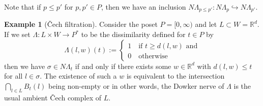 \documentclass[10pt,a4paper]{article}
\theoremstyle{definition}
\newtheorem{ex}{Example}[thm]
\newcommand{\R}{\mathbb{R}}
\begin{document}
Note that if $p\leq p'$ for $p,p'\in P$, then we have an inclusion $N\Lambda_{p\leq p'}\colon N\Lambda_p\hookrightarrow N\Lambda_{p'}$.

\begin{ex}[Čech filtration]
	Consider the poset $P=[0,\infty)$ and let $L\subset W=\R^d$. If we set $\Lambda\colon L\times W\to P^*$ to be the dissimilarity defined for $t\in P$ by 
	$$
	\Lambda(l,w)(t) := \begin{cases}
		1\quad\text{if }t\geq d(l,w) \text{ and}\\
		0\quad\text{otherwise}
	\end{cases}
	$$
	then we have $\sigma\in N\Lambda_t$ if and only if there exists some $w\in\R^d$ with $d(l,w)\leq t$ for all $l\in\sigma$. The existence of such a $w$ is equivalent to the intersection $\bigcap_{l\in L}B_t(l)$ being non-empty or in other words, the Dowker nerve of $\Lambda$ is the usual ambient Čech complex of $L$.
\end{ex}
\end{document}

